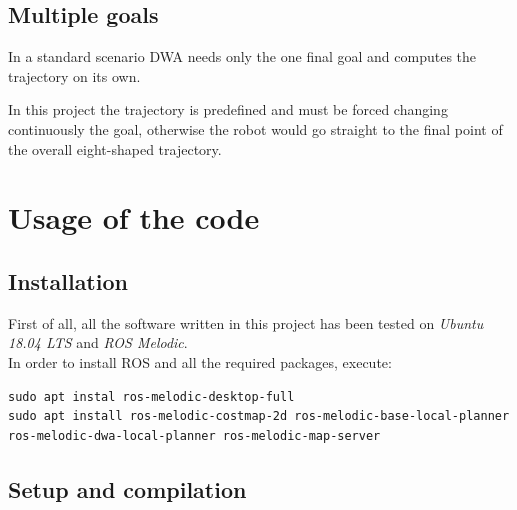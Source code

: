 \documentclass[11pt,a4paper]{article}
\begin{document}

\subsection{Multiple goals}

In a standard scenario DWA needs only the one final goal and computes the trajectory on its own.

In this project the trajectory is predefined and must be forced changing continuously the goal, otherwise the robot
would go straight to the final point of the overall eight-shaped trajectory.





\section{Usage of the code}



\subsection{Installation}

First of all, all the software written in this project has been tested on \textit{Ubuntu 18.04 LTS} and \textit{ROS Melodic}.\\

In order to install ROS and all the required packages, execute:

\begin{lstlisting}
sudo apt instal ros-melodic-desktop-full
sudo apt install ros-melodic-costmap-2d ros-melodic-base-local-planner ros-melodic-dwa-local-planner ros-melodic-map-server
\end{lstlisting}



\subsection{Setup and compilation}
\end{document}
